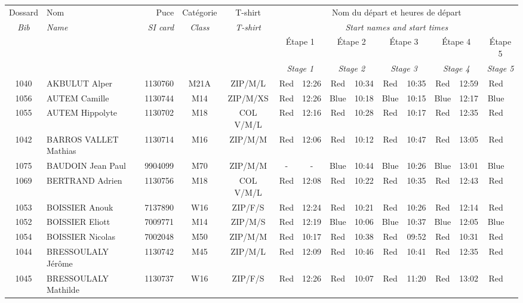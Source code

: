 \documentclass{report}
\begin{document}
  \begin{longtable}{|c|l|r|c|c|*{5}{cc|}}
    Dossard & Nom  & Puce    & Catégorie & T-shirt & \multicolumn{10}{c|}{Nom du départ et heures de départ} \\
    \itshape Bib     & \itshape Name & \itshape SI card & \itshape Class  & \itshape  T-shirt  & \multicolumn{10}{c|}{\itshape Start names and start times} \\
    \hline
    & & & & & \multicolumn{2}{c|}{Étape 1} & \multicolumn{2}{c|}{Étape 2} & \multicolumn{2}{c|}{Étape 3} & \multicolumn{2}{c|}{Étape 4} & \multicolumn{2}{c|}{Étape 5} \\
    & & & & & \multicolumn{2}{c|}{\itshape Stage 1} & \multicolumn{2}{c|}{\itshape Stage 2} & \multicolumn{2}{c|}{\itshape Stage 3} & \multicolumn{2}{c|}{\itshape Stage 4} & \multicolumn{2}{c|}{\itshape Stage 5} \\
    \hline
    1040 & AKBULUT Alper & 1130760 & M21A & ZIP/M/L & Red & 12:26 & Red & 10:34 & Red & 10:35 & Red & 12:59 & Red &  \\
    1056 & AUTEM Camille & 1130744 & M14 & ZIP/M/XS & Red & 12:26 & Blue & 10:18 & Blue & 10:15 & Blue & 12:17 & Blue &  \\
    1055 & AUTEM Hippolyte & 1130702 & M18 & COL V/M/L & Red & 12:16 & Red & 10:28 & Red & 10:17 & Red & 12:35 & Red &  \\
    1042 & BARROS VALLET Mathias & 1130714 & M16 & ZIP/M/M & Red & 12:06 & Red & 10:12 & Red & 10:47 & Red & 13:05 & Red &  \\
    1075 & BAUDOIN Jean Paul & 9904099 & M70 & ZIP/M/M & - &  - & Blue & 10:44 & Blue & 10:26 & Blue & 13:01 & Blue &  \\
    1069 & BERTRAND Adrien & 1130756 & M18 & COL V/M/L & Red & 12:08 & Red & 10:22 & Red & 10:35 & Red & 12:43 & Red &  \\
    1053 & BOISSIER Anouk & 7137890 & W16 & ZIP/F/S & Red & 12:24 & Red & 10:21 & Red & 10:26 & Red & 12:14 & Red &  \\
    1052 & BOISSIER Eliott & 7009771 & M14 & ZIP/M/S & Red & 12:19 & Blue & 10:06 & Blue & 10:37 & Blue & 12:05 & Blue &  \\
    1054 & BOISSIER Nicolas & 7002048 & M50 & ZIP/M/M & Red & 10:17 & Red & 10:38 & Red & 09:52 & Red & 10:31 & Red &  \\
    1044 & BRESSOULALY Jérôme & 1130742 & M45 & ZIP/M/L & Red & 12:09 & Red & 10:46 & Red & 10:41 & Red & 12:35 & Red &  \\
    1045 & BRESSOULALY Mathilde & 1130737 & W16 & ZIP/F/S & Red & 12:26 & Red & 10:07 & Red & 11:20 & Red & 13:02 & Red &  \\

\end{longtable}
\end{document}
